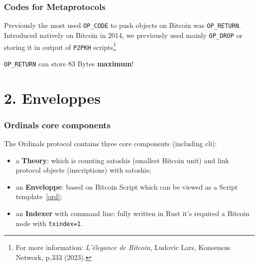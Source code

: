 \documentclass[hyperref={colorlinks=true}]{beamer}
\begin{document}
\begin{frame}
\frametitle{Codes for Metaprotocols}

\begin{center}

Previously the most used \texttt{OP\_CODE} to push objects on Bitcoin was \texttt{OP\_RETURN}.\\
\vspace{0.8cm}
Introduced natively on Bitcoin in 2014, we previously used mainly \texttt{OP\_DROP} or storing it in output of \texttt{P2PKH} scripts\footnote{For more information: {\it L'élegance de Bitcoin}, Ludovic Lars, Konsensus Network, p.333 (2023).}\\

\vspace{0.8cm}

{\Large \texttt{OP\_RETURN} can store 83 Bytes {\bf maximum}!}

\end{center}

\end{frame}




\section{2. Enveloppes}

\begin{frame}
\frametitle{Ordinals core components}

\begin{center}
{\Large The Ordinals protocol contains three core components} (including cli):
\vspace{0.3cm}
\begin{itemize}

\item a {\bf Theory}: which is counting satoshis (smallest Bitcoin unit) and link protocol objects (inscriptions) with satoshis;\\

\item an {\bf Enveloppe}: based on Bitcoin Script which can be viewed as a Script template~\ref{ord};\\

\item an {\bf Indexer} with command line: fully written in Rust it's required a Bitcoin node with \texttt{txindex=1}.\\

\end{itemize}

\end{center}

\end{frame}
\end{document}
